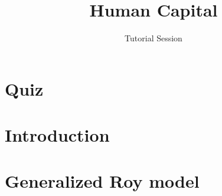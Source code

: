
\title{Human Capital}
\subtitle{Tutorial Session}
\date{}


\maketitle

\setcounter{page}{1}
\thispagestyle{empty}

\vspace{0.5cm}\tableofcontents\clearpage

\section{Quiz}
\FloatBarrier\newpage

\section{Introduction}
\FloatBarrier\newpage

\section{Generalized Roy model}
\FloatBarrier\newpage




